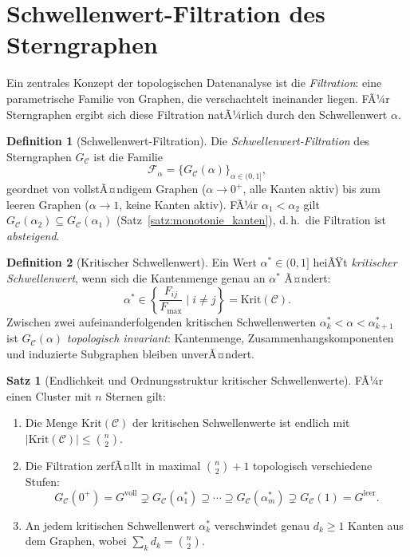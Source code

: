 ﻿\documentclass[a4paper,12pt]{report}
\theoremstyle{definition}
\newtheorem{definition}{Definition}
\newtheorem{satz}{Satz}
\begin{document}
\section{Schwellenwert-Filtration des Sterngraphen}
\label{sec:filtration}

Ein zentrales Konzept der topologischen Datenanalyse ist die \emph{Filtration}: eine parametrische Familie von Graphen, die verschachtelt ineinander liegen. FÃ¼r Sterngraphen ergibt sich diese Filtration natÃ¼rlich durch den Schwellenwert $\alpha$.

\begin{definition}[Schwellenwert-Filtration]
\label{def:filtration}
Die \emph{Schwellenwert-Filtration} des Sterngraphen $G_\mathcal{C}$ ist die Familie
\[
\mathcal{F}_\alpha = \{G_\mathcal{C}(\alpha)\}_{\alpha \in (0,1]},
\]
geordnet von vollstÃ¤ndigem Graphen ($\alpha \to 0^+$, alle Kanten aktiv) bis zum leeren Graphen ($\alpha \to 1$, keine Kanten aktiv). FÃ¼r $\alpha_1 < \alpha_2$ gilt $G_\mathcal{C}(\alpha_2) \subseteq G_\mathcal{C}(\alpha_1)$ (Satz~\ref{satz:monotonie_kanten}), d.\,h.\ die Filtration ist \emph{absteigend}.
\end{definition}

\begin{definition}[Kritischer Schwellenwert]
\label{def:kritischer_alpha}
Ein Wert $\alpha^* \in (0, 1]$ heiÃŸt \emph{kritischer Schwellenwert}, wenn sich die Kantenmenge genau an $\alpha^*$ Ã¤ndert:
\[
\alpha^* \in \left\{\frac{F_{ij}}{F_\mathrm{max}} \;\bigg|\; i \neq j\right\} = \text{Krit}(\mathcal{C}).
\]
Zwischen zwei aufeinanderfolgenden kritischen Schwellenwerten $\alpha^*_k < \alpha < \alpha^*_{k+1}$ ist $G_\mathcal{C}(\alpha)$ \emph{topologisch invariant}: Kantenmenge, Zusammenhangskomponenten und induzierte Subgraphen bleiben unverÃ¤ndert.
\end{definition}

\begin{satz}[Endlichkeit und Ordnungsstruktur kritischer Schwellenwerte]
\label{satz:endlichkeit}
FÃ¼r einen Cluster mit $n$ Sternen gilt:
\begin{enumerate}[label=(\roman*)]
    \item Die Menge $\mathrm{Krit}(\mathcal{C})$ der kritischen Schwellenwerte ist endlich mit $|\mathrm{Krit}(\mathcal{C})| \leq \binom{n}{2}$.
    \item Die Filtration zerfÃ¤llt in maximal $\binom{n}{2} + 1$ topologisch verschiedene Stufen:
          \[G_\mathcal{C}(0^+) = G^\mathrm{voll} \supsetneq G_\mathcal{C}(\alpha^*_1) \supseteq \cdots
           \supseteq G_\mathcal{C}(\alpha^*_m) \supsetneq G_\mathcal{C}(1) = G^\mathrm{leer}.\]
    \item An jedem kritischen Schwellenwert $\alpha^*_k$ verschwindet genau $d_k \geq 1$ Kanten aus dem Graphen, wobei $\sum_k d_k = \binom{n}{2}$.
\end{enumerate}
\end{satz}
\end{document}
